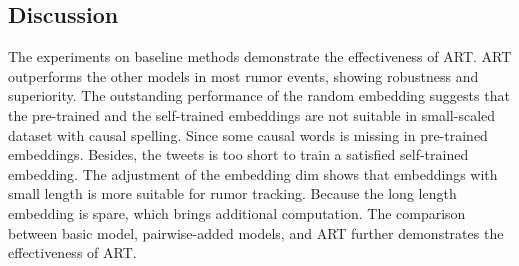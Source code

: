 \subsection{Discussion}
The experiments on baseline methods demonstrate the effectiveness of ART. ART outperforms the other models in most rumor events, showing robustness and superiority. The outstanding performance of the random embedding suggests that the pre-trained and the self-trained embeddings are not suitable in small-scaled dataset with causal spelling. Since some causal words is missing in pre-trained embeddings. Besides, the tweets is too short to train a satisfied self-trained embedding. The adjustment of the embedding dim shows that embeddings with small length is more suitable for rumor tracking. Because the long length embedding is spare, which brings additional computation. The comparison between basic model, pairwise-added models, and ART further demonstrates the effectiveness of ART. 

